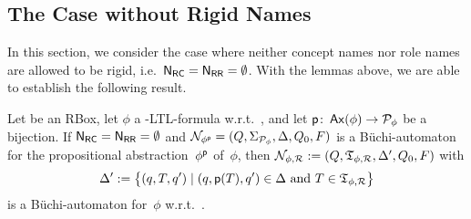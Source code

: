 \subsection{The Case without Rigid Names}\label{sec:ba-no-rigid}

In this section, we consider the case where neither concept names nor role names
are allowed to be rigid, i.e.~$\mathsf{N_{RC}}=\mathsf{N_{RR}}=\emptyset$.  With the lemmas above, we
are able to establish the following result.

\begin{theorem}\label{thm:ba-shoq-ltl-no-rigid}
    Let \Rmc be an RBox, let $\phi$ a \SHOQ-LTL-formula w.r.t.~\Rmc, and let
    $\mathsf{p}\colon\operatorname{\mathsf{Ax}}(\phi)\to\mathcal{P}_\phi$ be a bijection.
    If $\mathsf{N_{RC}}=\mathsf{N_{RR}}=\emptyset$ and
    $\mathcal{N}_{\phi^\mathsf{p}}=(Q,\Sigma_{\mathcal{P}_\phi},\Delta,Q_0,F)$ is a Büchi-automaton
    for the propositional abstraction~$\phi^\mathsf{p}$ of~$\phi$, then
    $\mathcal{N}_{\phi,\mathcal{R}}:=(Q,\mathfrak{T}_{\phi,\mathcal{R}},\Delta',Q_0,F)$ with
    \[\Delta':=\bigl\{(q,T,q')\mid%
        (q,\psf(T),q')\in\Delta\ \text{and}\ T\in\Tmf_{\phi,\Rmc}\bigr\}\]
    is a Büchi-automaton for~$\phi$ w.r.t.~\Rmc.
\end{theorem}


